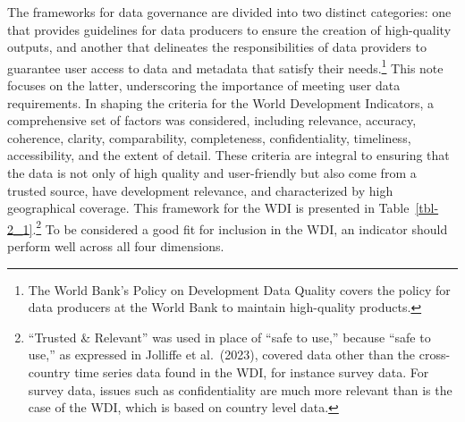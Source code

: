 \documentclass[
  11pt,
  a4paper,
  DIV=11,
  numbers=noendperiod]{scrreprt}
\begin{document}
The frameworks for data governance are divided into two distinct
categories: one that provides guidelines for data producers to ensure
the creation of high-quality outputs, and another that delineates the
responsibilities of data providers to guarantee user access to data and
metadata that satisfy their needs.\footnote{The World Bank's Policy on
  Development Data Quality covers the policy for data producers at the
  World Bank to maintain high-quality products.} This note focuses on
the latter, underscoring the importance of meeting user data
requirements. In shaping the criteria for the World Development
Indicators, a comprehensive set of factors was considered, including
relevance, accuracy, coherence, clarity, comparability, completeness,
confidentiality, timeliness, accessibility, and the extent of detail.
These criteria are integral to ensuring that the data is not only of
high quality and user-friendly but also come from a trusted source, have
development relevance, and characterized by high geographical coverage.
This framework for the WDI is presented in
Table~\ref{tbl-2_1}.\footnote{``Trusted \& Relevant'' was used in place
  of ``safe to use,'' because ``safe to use,'' as expressed in Jolliffe
  et al.~(2023), covered data other than the cross-country time series
  data found in the WDI, for instance survey data. For survey data,
  issues such as confidentiality are much more relevant than is the case
  of the WDI, which is based on country level data.} To be considered a
good fit for inclusion in the WDI, an indicator should perform well
across all four dimensions.
\end{document}
